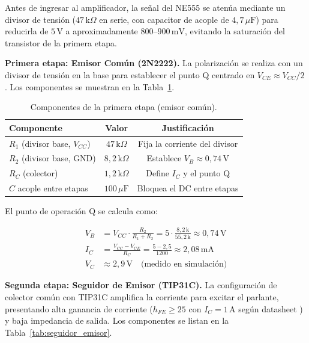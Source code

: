 \documentclass[12pt,onecolumn]{IEEEtran}
\begin{document}
Antes de ingresar al amplificador, la señal del NE555 se atenúa mediante un divisor de tensión ($47\,\text{k}\Omega$ en serie, con capacitor de acople de $4{,}7\,\mu\text{F}$) para reducirla de $5\,\text{V}$ a aproximadamente $800$--$900\,\text{mV}$, evitando la saturación del transistor de la primera etapa.

\textbf{Primera etapa: Emisor Común (2N2222).}
La polarización se realiza con un divisor de tensión en la base para establecer el punto Q centrado en $V_{CE} \approx V_{CC}/2$ \cite{2n2222ds}. Los componentes se muestran en la Tabla~\ref{tab:emisor_comun}.

\begin{table}[H]
\centering
\caption{Componentes de la primera etapa (emisor común).}
\label{tab:emisor_comun}
\begin{tabular}{lcc}
\toprule
\textbf{Componente} & \textbf{Valor} & \textbf{Justificación} \\
\midrule
$R_1$ (divisor base, $V_{CC}$) & $47\,\text{k}\Omega$    & Fija la corriente del divisor \\
$R_2$ (divisor base, GND)      & $8{,}2\,\text{k}\Omega$ & Establece $V_B \approx 0{,}74\,\text{V}$ \\
$R_C$ (colector)               & $1{,}2\,\text{k}\Omega$ & Define $I_C$ y el punto Q \\
$C$ acople entre etapas        & $100\,\mu\text{F}$      & Bloquea el DC entre etapas \\
\bottomrule
\end{tabular}
\end{table}

El punto de operación Q se calcula como:

\begin{align}
    V_B &= V_{CC} \cdot \frac{R_2}{R_1 + R_2}
         = 5 \cdot \frac{8{,}2\,\text{k}}{55{,}2\,\text{k}}
         \approx 0{,}74\,\text{V} \\
    I_C &= \frac{V_{CC} - V_{CE}}{R_C}
         = \frac{5 - 2{,}5}{1200}
         \approx 2{,}08\,\text{mA} \\
    V_C &\approx 2{,}9\,\text{V} \quad \text{(medido en simulación)}
\end{align}

\textbf{Segunda etapa: Seguidor de Emisor (TIP31C).}
La configuración de colector común con TIP31C amplifica la corriente para excitar el parlante, presentando alta ganancia de corriente ($h_{FE} \geq 25$ con $I_C = 1\,\text{A}$ según datasheet \cite{tip31ds}) y baja impedancia de salida. Los componentes se listan en la Tabla~\ref{tab:seguidor_emisor}.
\end{document}
